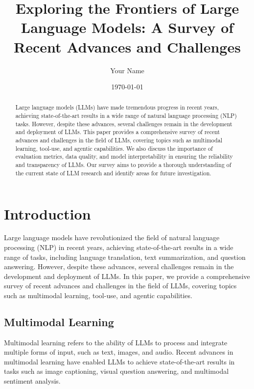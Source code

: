\documentclass{article}
\begin{document}
\title{Exploring the Frontiers of Large Language Models: A Survey of Recent Advances and Challenges}

\author{Your Name}
\date{\today}

\maketitle

\begin{abstract}
Large language models (LLMs) have made tremendous progress in recent years, achieving state-of-the-art results in a wide range of natural language processing (NLP) tasks. However, despite these advances, several challenges remain in the development and deployment of LLMs. This paper provides a comprehensive survey of recent advances and challenges in the field of LLMs, covering topics such as multimodal learning, tool-use, and agentic capabilities. We also discuss the importance of evaluation metrics, data quality, and model interpretability in ensuring the reliability and transparency of LLMs. Our survey aims to provide a thorough understanding of the current state of LLM research and identify areas for future investigation.
\end{abstract}

\section{Introduction}
Large language models have revolutionized the field of natural language processing (NLP) in recent years, achieving state-of-the-art results in a wide range of tasks, including language translation, text summarization, and question answering. However, despite these advances, several challenges remain in the development and deployment of LLMs. In this paper, we provide a comprehensive survey of recent advances and challenges in the field of LLMs, covering topics such as multimodal learning, tool-use, and agentic capabilities.

\subsection{Multimodal Learning}
Multimodal learning refers to the ability of LLMs to process and integrate multiple forms of input, such as text, images, and audio. Recent advances in multimodal learning have enabled LLMs to achieve state-of-the-art results in tasks such as image captioning, visual question answering, and multimodal sentiment analysis.
\end{document}
